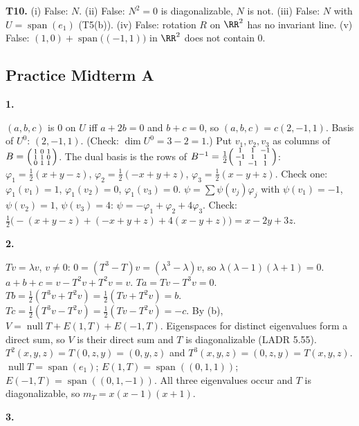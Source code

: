 \documentclass[10pt]{scrartcl}
\DeclareMathOperator{\nul}{null}
\DeclareMathOperator{\spn}{span}
\begin{document}
\textbf{T10.} (i) False: $N$. (ii) False: $N^2=0$ is diagonalizable, $N$ is not. (iii) False: $N$ with $U=\spn(e_1)$ (T5(b)). (iv) False: rotation $R$ on $\RR^2$ has no invariant line. (v) False: $(1,0)+\spn\big((-1,1)\big)$ in $\RR^2$ does not contain $0$.

\subsection*{Practice Midterm A}
\textbf{1.}
\begin{enumerate}[a)]
  \ii $(a,b,c)$ is $0$ on $U$ iff $a+2b=0$ and $b+c=0$, so $(a,b,c)=c(2,-1,1)$. Basis of $U^0$: $(2,-1,1)$. (Check: $\dim U^0=3-2=1$.)
  \ii Put $v_1,v_2,v_3$ as columns of $B=\begin{psmallmatrix}1&0&1\\1&1&0\\0&1&1\end{psmallmatrix}$. The dual basis is the rows of $B^{-1}=\tfrac12\begin{psmallmatrix}1&1&-1\\-1&1&1\\1&-1&1\end{psmallmatrix}$: $\varphi_1=\tfrac12(x+y-z)$, $\varphi_2=\tfrac12(-x+y+z)$, $\varphi_3=\tfrac12(x-y+z)$. Check one: $\varphi_1(v_1)=1$, $\varphi_1(v_2)=0$, $\varphi_1(v_3)=0$.
  \ii $\psi=\sum\psi(v_j)\varphi_j$ with $\psi(v_1)=-1$, $\psi(v_2)=1$, $\psi(v_3)=4$: $\psi=-\varphi_1+\varphi_2+4\varphi_3$. Check: $\tfrac12\big(-(x+y-z)+(-x+y+z)+4(x-y+z)\big)=x-2y+3z$.
\end{enumerate}
\textbf{2.}
\begin{enumerate}[a)]
  \ii $Tv=\lambda v$, $v\ne0$: $0=(T^3-T)v=(\lambda^3-\lambda)v$, so $\lambda(\lambda-1)(\lambda+1)=0$.
  \ii $a+b+c=v-T^2v+T^2v=v$. $Ta=Tv-T^3v=0$. $Tb=\tfrac12(T^3v+T^2v)=\tfrac12(Tv+T^2v)=b$. $Tc=\tfrac12(T^3v-T^2v)=\tfrac12(Tv-T^2v)=-c$.
  \ii By (b), $V=\nul T+E(1,T)+E(-1,T)$. Eigenspaces for distinct eigenvalues form a direct sum, so $V$ is their direct sum and $T$ is diagonalizable (LADR 5.55).
  \ii $T^2(x,y,z)=T(0,z,y)=(0,y,z)$ and $T^3(x,y,z)=(0,z,y)=T(x,y,z)$. $\nul T=\spn(e_1)$; $E(1,T)=\spn((0,1,1))$; $E(-1,T)=\spn((0,1,-1))$. All three eigenvalues occur and $T$ is diagonalizable, so $m_T=x(x-1)(x+1)$.
\end{enumerate}
\textbf{3.}
\end{document}
